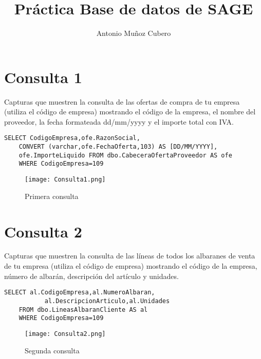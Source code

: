 \documentclass{article}
\title{Práctica Base de datos de SAGE}
\author{Antonio Muñoz Cubero}
\begin{document}
  \maketitle
      \pagestyle{fancy} 

\newpage
  \tableofcontents


\newpage
  \section{Consulta 1}
    Capturas que muestren la consulta de las ofertas de compra de tu empresa (utiliza el código de empresa) mostrando el código de la empresa, el nombre del proveedor, la fecha formateada dd/mm/yyyy y el importe total con IVA.

    \begin{lstlisting}[style=C]
    SELECT CodigoEmpresa,ofe.RazonSocial,
    CONVERT (varchar,ofe.FechaOferta,103) AS [DD/MM/YYYY],
    ofe.ImporteLiquido FROM dbo.CabeceraOfertaProveedor AS ofe 
    WHERE CodigoEmpresa=109
    \end{lstlisting}
    
    \begin{figure}[h]
        \centering
        \texttt{[image: Consulta1.png]}
        \caption{Primera consulta}
        \label{fig:my_label}
    \end{figure}
    
\newpage
  \section{Consulta 2}
    Capturas que muestren la consulta de las líneas de todos los albaranes de venta de tu empresa (utiliza el código de empresa) mostrando el código de la empresa, número de albarán, descripción del artículo y unidades.

    \begin{lstlisting}[style=C]
    SELECT al.CodigoEmpresa,al.NumeroAlbaran,
           al.DescripcionArticulo,al.Unidades 
    FROM dbo.LineasAlbaranCliente AS al 
    WHERE CodigoEmpresa=109
    \end{lstlisting}
    
    \begin{figure}[h]
        \centering
        \texttt{[image: Consulta2.png]}
        \caption{Segunda consulta}
        \label{fig:my_label}
    \end{figure}
    
\end{document}
